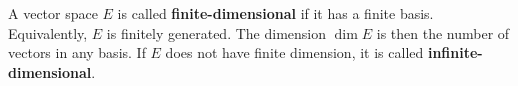 A vector space $E$ is called \textbf{finite-dimensional} if it has a finite basis. Equivalently, $E$ is finitely generated. The dimension $\dim E$ is then the number of vectors in any basis. If $E$ does not have finite dimension, it is called \textbf{infinite-dimensional}.
